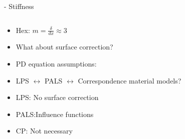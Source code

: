 \begin{frame}[t]{\secname}{\subsecname{} - Stiffness}

\begin{columns}%
  \begin{column}{0.49\textwidth}
    \begin{itemize}
      \item Hex: $m=\frac{\delta}{dx}\approx3$
      \item What about surface correction?
      \item<2-> PD equation assumptions:
      \item<3-> LPS $\leftrightarrow$ PALS $\leftrightarrow$ Correspondence material models?
      \item<4-> LPS: \tabto{1.1cm}No surface correction
      \item<4-> PALS:\tabto{1.1cm}Influence functions
      \item<4-> CP:  \tabto{1.1cm}Not necessary
    \end{itemize}
  \end{column}
  \begin{column}{0.49\textwidth}
    

\end{column}
\end{columns}
\end{frame}
